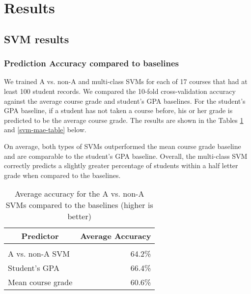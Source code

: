 
\section{Results}

\subsection{SVM results}

\subsubsection{Prediction Accuracy compared to baselines}

We trained A vs. non-A and multi-class SVMs for each of 17 courses that had at least 100 student records. We compared the 10-fold cross-validation accuracy against the average course grade and student's GPA baselines. For the student's GPA baseline, if a student has not taken a course before, his or her grade is predicted to be the average course grade. The results are shown in the Tables \ref{svm-accuracy-table} and \ref{svm-mae-table} below.

On average, both types of SVMs outperformed the mean course grade baseline and are comparable to the student's GPA baseline. Overall, the multi-class SVM correctly predicts a slightly greater percentage of students within a half letter grade when compared to the baselines.

\begin{table}[htbp]\scriptsize
\label{svm-accuracy-table}
\begin{center}
\begin{tabular}{lr}
\multicolumn{1}{c}{\bf Predictor}  &\multicolumn{1}{c}{\bf Average Accuracy}
\\ \hline \\
A vs. non-A SVM &64.2\% \\
Student's GPA   &66.4\% \\
Mean course grade &60.6\% \\
\end{tabular}
\caption{Average accuracy for the A vs. non-A SVMs compared to the baselines (higher is better)}
\end{center}
\end{table}


